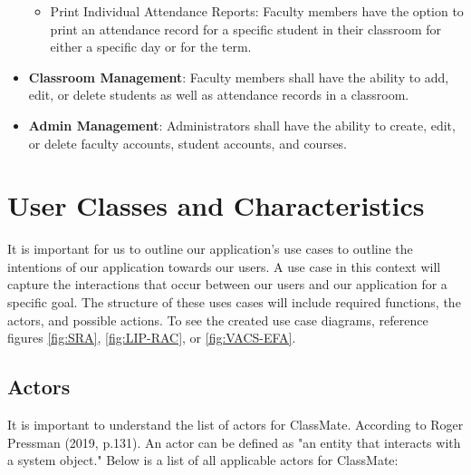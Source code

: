 \documentclass[letterpaper,12pt,oneside,listof=totoc]{scrreprt}
\begin{document}
\begin{itemize}
\begin{itemize}
        \item Print Individual Attendance Reports: Faculty members have the option to print an attendance record for a specific student in their classroom for either a specific day or for the term.
    \end{itemize}
    \item \textbf{Classroom Management}: Faculty members shall have the ability to add, edit, or delete students as well as attendance records in a classroom.
    \item \textbf{Admin Management}: Administrators shall have the ability to create, edit, or delete faculty accounts, student accounts, and courses.  
\end{itemize}

\section{User Classes and Characteristics}
It is important for us to outline our application's use cases to outline the intentions of our application towards our users. A use case in this context will capture the interactions that occur between our users and our application for a specific goal. The structure of these uses cases will include required functions, the actors, and possible actions. To see the created use case diagrams, reference figures \ref{fig:SRA}, \ref{fig:LIP-RAC}, or \ref{fig:VACS-EFA}.

\subsection{Actors}
It is important to understand the list of actors for ClassMate. According to Roger Pressman (2019, p.131). An actor can be defined as "an entity that interacts with a system object."  Below is a list of all applicable actors for ClassMate:
\clearpage
\end{document}
